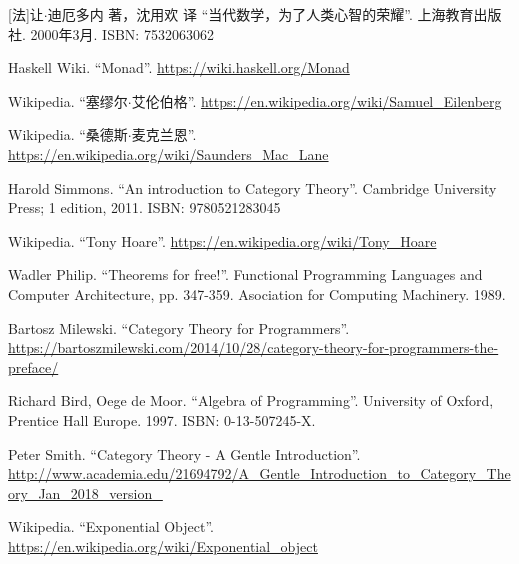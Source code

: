 \documentclass{article}
\begin{document}
\ifx\wholebook\relax \else
\begin{thebibliography}{99}

[法]让$\cdot$迪厄多内 著，沈用欢 译 ``当代数学，为了人类心智的荣耀''. 上海教育出版社. 2000年3月. ISBN: 7532063062

Haskell Wiki. ``Monad''. \url{https://wiki.haskell.org/Monad}

Wikipedia. ``塞缪尔$\cdot$艾伦伯格''. \url{https://en.wikipedia.org/wiki/Samuel_Eilenberg}

Wikipedia. ``桑德斯$\cdot$麦克兰恩''. \url{https://en.wikipedia.org/wiki/Saunders_Mac_Lane}

Harold Simmons. ``An introduction to Category Theory''.  Cambridge University Press; 1 edition, 2011. ISBN: 9780521283045

Wikipedia. ``Tony Hoare''. \url{https://en.wikipedia.org/wiki/Tony_Hoare}

Wadler Philip. ``Theorems for free!''. Functional Programming Languages and Computer Architecture, pp. 347-359. Asociation for Computing Machinery. 1989.

Bartosz Milewski. ``Category Theory for Programmers''. \url{https://bartoszmilewski.com/2014/10/28/category-theory-for-programmers-the-preface/}

Richard Bird, Oege de Moor. ``Algebra of Programming''. University of Oxford, Prentice Hall Europe. 1997. ISBN: 0-13-507245-X.

Peter Smith. ``Category Theory - A Gentle Introduction''. \url{http://www.academia.edu/21694792/A_Gentle_Introduction_to_Category_Theory_Jan_2018_version_}

Wikipedia. ``Exponential Object''. \url{https://en.wikipedia.org/wiki/Exponential_object}

\end{thebibliography}

\expandafter\enddocument

\fi
\end{document}
